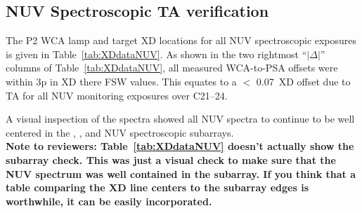 \subsection{NUV Spectroscopic TA verification}\label{subsec:NspVER}
The P2 WCA lamp and target XD locations for all NUV spectroscopic exposures is given in Table~\ref{tab:XDdataNUV}.
As shown in the two rightmost ``$| \Delta |$'' columns of Table~\ref{tab:XDdataNUV}, all measured WCA-to-PSA offsets were within 3p in XD there FSW values. This equates to a $<$ 0.07\arcsec\ XD offset due to TA
for all NUV monitoring exposures over C21--24.

A visual inspection of the spectra showed all NUV spectra to continue to be well centered in the , , and  NUV spectroscopic subarrays.
\\
{\bf Note to reviewers: Table~\ref{tab:XDdataNUV} doesn't actually show the subarray check. This was just a visual check to
make sure that the NUV spectrum was well contained in the subarray. If you think that a table comparing the XD line centers to
the subarray edges is worthwhile, it can be easily incorporated.}\\

